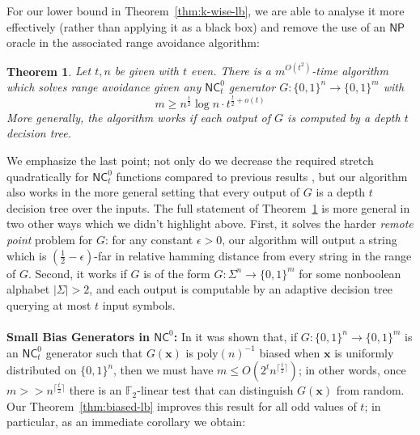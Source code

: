 \documentclass[11pt]{article}
\newtheorem{theorem}{Theorem}
\newcommand{\B}{\{0,1\}}
\newcommand{\poly}{\mathrm{poly}}
\begin{document}
For our lower bound in Theorem~\ref{thm:k-wise-lb}, we are able to analyse it more effectively (rather than applying it as a black box) and remove the use of an $\mathsf{NP}$ oracle in the associated range avoidance algorithm:

\begin{theorem}
\label{thm:polytime-avoid}
Let $t,n$ be given with $t$ even. There is a $m^{O(t^2)}$-time algorithm which solves range avoidance given any $\mathsf{NC}^0_t$ generator $G: \B^n \to \B^m$ with
\[
m \geq  n^{\frac{t}{2}} \log n \cdot t^{\frac{t}{2} + o(t)}
\]
More generally, the algorithm works if each output of $G$ is computed by a depth $t$ decision tree.
\end{theorem}
We emphasize the last point; not only do we decrease the required stretch quadratically for $\mathsf{NC}^0_t$ functions compared to previous results \cite{guruswami2022range,karthik}, but our algorithm also works in the more general setting that every output of $G$ is a depth $t$ decision tree over the inputs. The full statement of Theorem~\ref{thm:polytime-avoid} is more general in two other ways which we didn't highlight above. First, it solves the harder \emph{remote point} problem for $G$: for any constant $\epsilon>0$, our algorithm will output a string which is $(\frac{1}{2}-\epsilon)$-far in relative hamming distance from every string in the range of $G$. Second, it works if $G$ is of the form $G: \Sigma^n \to \B^m$ for some nonboolean alphabet $|\Sigma|>2$, and each output is computable by an adaptive decision tree querying at most $t$ input symbols.
~\\~\\
{\bf \noindent Small Bias Generators in $\mathsf{NC}^0$:} In \cite{mossel-epsilon} it was shown that, if $G: \B^n \to \B^m$ is an $\mathsf{NC}^0_t$ generator such that $G(\bm{x})$ is $\poly(n)^{-1}$ biased when $\bm{x}$ is uniformly distributed on $\B^n$, then we must have $m \leq O(2^tn^{\lceil \frac{t}{2}\rceil })$; in other words, once $m >> n^{\lceil \frac{t}{2} \rceil}$ there is an $\mathbb{F}_2$-linear test that can distinguish $G(\bm{x})$ from random. Our Theorem~\ref{thm:biased-lb} improves this result for all odd values of $t$; in particular, as an immediate corollary we obtain:
\end{document}
